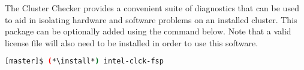 The \Intel{} Cluster Checker provides a convenient suite of diagnostics that
can be used to aid in isolating hardware and software problems on an installed
cluster. This package can be optionally added using the command below. Note
that a valid license file will also need to be installed in order to
use this software.

\begin{lstlisting}[language=bash,keywords={}]
[master]$ (*\install*) intel-clck-fsp
\end{lstlisting}
